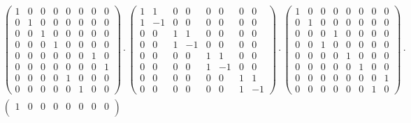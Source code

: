 \documentclass[10pt]{article}
\theoremstyle{definition}
\begin{document}
\begin{align*}
                        & \begin{pmatrix}
                            1 & 0 & 0 & 0 & 0 & 0 & 0 & 0 \\
                            0 & 1 & 0 & 0 & 0 & 0 & 0 & 0 \\
                            0 & 0 & 1 & 0 & 0 & 0 & 0 & 0 \\
                            0 & 0 & 0 & 1 & 0 & 0 & 0 & 0 \\
                            0 & 0 & 0 & 0 & 0 & 0 & 1 & 0 \\
                            0 & 0 & 0 & 0 & 0 & 0 & 0 & 1 \\
                            0 & 0 & 0 & 0 & 1 & 0 & 0 & 0 \\
                            0 & 0 & 0 & 0 & 0 & 1 & 0 & 0
                          \end{pmatrix}\cdot
  \begin{pmatrix}
    1 & 1  & 0 & 0  & 0 & 0  & 0 & 0  \\
    1 & -1 & 0 & 0  & 0 & 0  & 0 & 0  \\
    0 & 0  & 1 & 1  & 0 & 0  & 0 & 0  \\
    0 & 0  & 1 & -1 & 0 & 0  & 0 & 0  \\
    0 & 0  & 0 & 0  & 1 & 1  & 0 & 0  \\
    0 & 0  & 0 & 0  & 1 & -1 & 0 & 0  \\
    0 & 0  & 0 & 0  & 0 & 0  & 1 & 1  \\
    0 & 0  & 0 & 0  & 0 & 0  & 1 & -1
  \end{pmatrix}\cdot
  \begin{pmatrix}
    1 & 0 & 0 & 0 & 0 & 0 & 0 & 0 \\
    0 & 1 & 0 & 0 & 0 & 0 & 0 & 0 \\
    0 & 0 & 0 & 1 & 0 & 0 & 0 & 0 \\
    0 & 0 & 1 & 0 & 0 & 0 & 0 & 0 \\
    0 & 0 & 0 & 0 & 1 & 0 & 0 & 0 \\
    0 & 0 & 0 & 0 & 0 & 1 & 0 & 0 \\
    0 & 0 & 0 & 0 & 0 & 0 & 0 & 1 \\
    0 & 0 & 0 & 0 & 0 & 0 & 1 & 0
  \end{pmatrix}\cdot                                              \\
                        & \begin{pmatrix}
                            1 & 0 & 0 & 0 & 0 & 0 & 0 & 0 \\

\end{pmatrix}
\end{align*}
\end{document}
